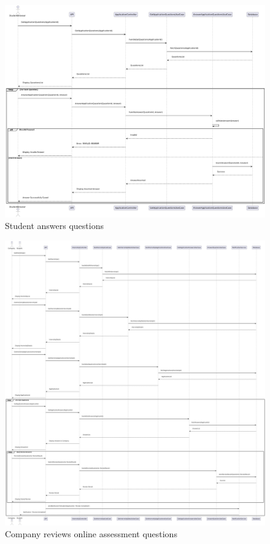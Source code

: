 \newpage

\begin{figure}[ht!]
    \centering
    \includegraphics[scale=0.28]{Images/ImagesSequenceDiagram/StudentAnswereQuestions.png}
    \caption{Student answers questions}
\end{figure}

\newpage

\begin{figure}[ht!]
    \centering
    \includegraphics[scale=0.19]{Images/ImagesSequenceDiagram/CompanyReviewsQuestions.png}
    \caption{Company reviews online assessment questions}
\end{figure}

